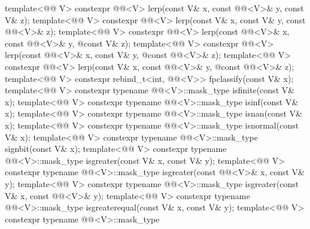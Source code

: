 \begin{codeblock}
{  template<@@ V>
    constexpr @@<V> lerp(const V& x, const @@<V>& y, const V& z);
  template<@@ V>
    constexpr @@<V> lerp(const V& x, const V& y, const @@<V>& z);
  template<@@ V>
    constexpr @@<V> lerp(const @@<V>& x, const @@<V>& y,
                                   @\itcorr@ const V& z);
  template<@@ V>
    constexpr @@<V> lerp(const @@<V>& x, const V& y,
                                   @\itcorr@ const @@<V>& z);
  template<@@ V>
    constexpr @@<V> lerp(const V& x, const @@<V>& y,
                                   @\itcorr@ const @@<V>& z);
  template<@@ V>
    constexpr rebind_t<int, @@<V>> fpclassify(const V& x);
  template<@@ V>
    constexpr typename @@<V>::mask_type isfinite(const V& x);
  template<@@ V>
    constexpr typename @@<V>::mask_type isinf(const V& x);
  template<@@ V>
    constexpr typename @@<V>::mask_type isnan(const V& x);
  template<@@ V>
    constexpr typename @@<V>::mask_type isnormal(const V& x);
  template<@@ V>
    constexpr typename @@<V>::mask_type signbit(const V& x);
  template<@@ V>
    constexpr typename @@<V>::mask_type
      isgreater(const V& x, const V& y);
  template<@@ V>
    constexpr typename @@<V>::mask_type
      isgreater(const @@<V>& x, const V& y);
  template<@@ V>
    constexpr typename @@<V>::mask_type
      isgreater(const V& x, const @@<V>& y);
  template<@@ V>
    constexpr typename @@<V>::mask_type
      isgreaterequal(const V& x, const V& y);
  template<@@ V>
    constexpr typename @@<V>::mask_type
}
\end{codeblock}
